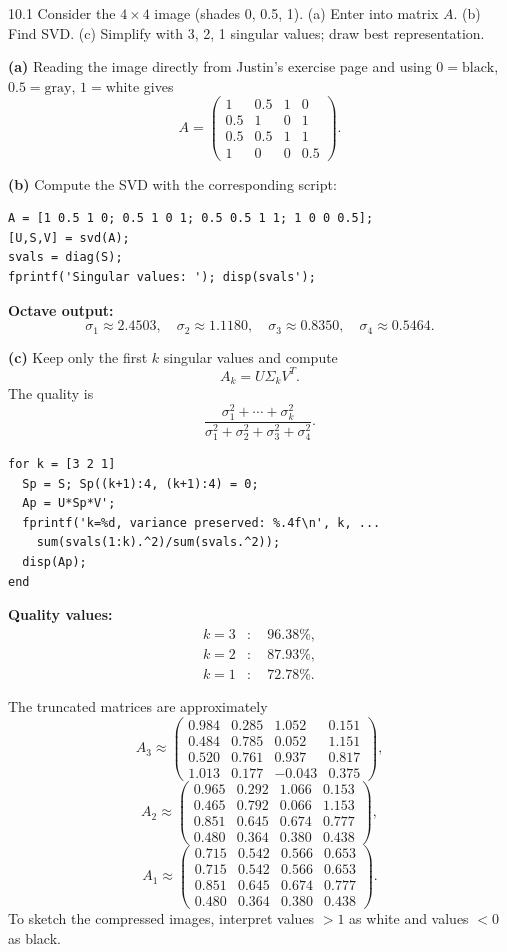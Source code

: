 \begin{exercise}{10.1}
Consider the $4\times4$ image (shades 0, 0.5, 1). (a) Enter into matrix $A$. (b) Find SVD. (c) Simplify with 3, 2, 1 singular values; draw best representation.
\end{exercise}
\begin{solution}
\textbf{(a)} Reading the image directly from Justin's exercise page and using $0=\text{black}$, $0.5=\text{gray}$, $1=\text{white}$ gives
\[
A = \begin{pmatrix}
1&0.5&1&0\\
0.5&1&0&1\\
0.5&0.5&1&1\\
1&0&0&0.5
\end{pmatrix}.
\]

\textbf{(b)} Compute the SVD with the corresponding script:
\begin{lstlisting}
A = [1 0.5 1 0; 0.5 1 0 1; 0.5 0.5 1 1; 1 0 0 0.5];
[U,S,V] = svd(A);
svals = diag(S);
fprintf('Singular values: '); disp(svals');
\end{lstlisting}
\textbf{Octave output:}
\[
\sigma_1\approx2.4503,\quad
\sigma_2\approx1.1180,\quad
\sigma_3\approx0.8350,\quad
\sigma_4\approx0.5464.
\]

\textbf{(c)} Keep only the first $k$ singular values and compute
\[
A_k=U\Sigma_k V^T.
\]
The quality is
\[
\frac{\sigma_1^2+\cdots+\sigma_k^2}{\sigma_1^2+\sigma_2^2+\sigma_3^2+\sigma_4^2}.
\]
\begin{lstlisting}
for k = [3 2 1]
  Sp = S; Sp((k+1):4, (k+1):4) = 0;
  Ap = U*Sp*V';
  fprintf('k=%d, variance preserved: %.4f\n', k, ...
    sum(svals(1:k).^2)/sum(svals.^2));
  disp(Ap);
end
\end{lstlisting}
\textbf{Quality values:}
\[
\begin{aligned}
k=3&:\quad 96.38\%,\\
k=2&:\quad 87.93\%,\\
k=1&:\quad 72.78\%.
\end{aligned}
\]

The truncated matrices are approximately
\[
A_3\approx
\begin{pmatrix}
0.984&0.285&1.052&0.151\\
0.484&0.785&0.052&1.151\\
0.520&0.761&0.937&0.817\\
1.013&0.177&-0.043&0.375
\end{pmatrix},
\]
\[
A_2\approx
\begin{pmatrix}
0.965&0.292&1.066&0.153\\
0.465&0.792&0.066&1.153\\
0.851&0.645&0.674&0.777\\
0.480&0.364&0.380&0.438
\end{pmatrix},
\]
\[
A_1\approx
\begin{pmatrix}
0.715&0.542&0.566&0.653\\
0.715&0.542&0.566&0.653\\
0.851&0.645&0.674&0.777\\
0.480&0.364&0.380&0.438
\end{pmatrix}.
\]
To sketch the compressed images, interpret values $>1$ as white and values $<0$ as black.
\end{solution}

